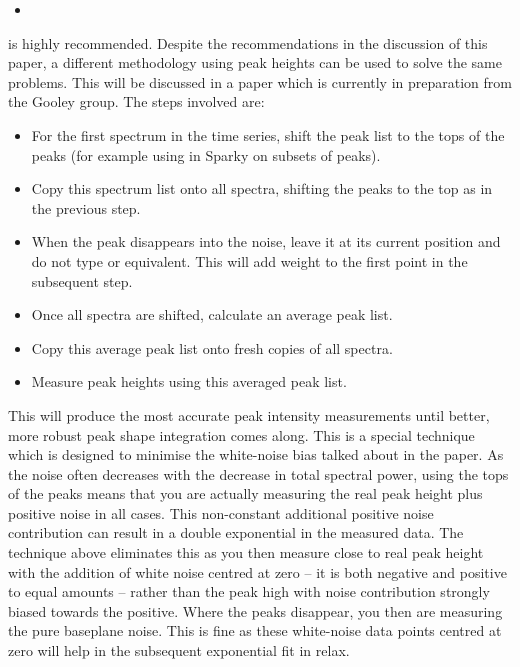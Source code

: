 \begin{itemize}
\item {}
\end{itemize}

is highly recommended.  Despite the recommendations in the discussion of this paper, a different methodology using peak heights can be used to solve the same problems.  This will be discussed in a paper which is currently in preparation from the Gooley group.  The steps involved are:

\begin{itemize}
\item For the first spectrum in the time series, shift the peak list to the tops of the peaks (for example using  in Sparky on subsets of peaks).
\item Copy this  spectrum list onto all spectra, shifting the peaks to the top as in the previous step.
\item When the peak disappears into the noise, leave it at its current position and do not type  or equivalent.  This will add weight to the first point in the subsequent step.
\item Once all spectra are shifted, calculate an average peak list.
\item Copy this average peak list onto fresh copies of all spectra.
\item Measure peak heights using this averaged peak list.
\end{itemize}

This will produce the most accurate peak intensity measurements until better, more robust peak shape integration comes along.  This is a special technique which is designed to minimise the white-noise bias talked about in the \citet{Viles01} paper.  As the noise often decreases with the decrease in total spectral power, using the tops of the peaks means that you are actually measuring the real peak height plus positive noise in all cases.  This non-constant additional positive noise contribution can result in a double exponential in the measured data.  The technique above eliminates this as you then measure close to real peak height with the addition of white noise centred at zero -- it is both negative and positive to equal amounts -- rather than the peak high with noise contribution strongly biased towards the positive.  Where the peaks disappear, you then are measuring the pure baseplane noise.  This is fine as these white-noise data points centred at zero will help in the subsequent exponential fit in relax. 

